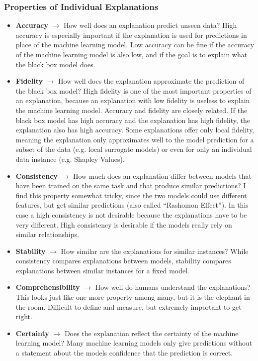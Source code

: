 \subsubsection{Properties of Individual Explanations}
\begin{itemize}
    \item \textbf{Accuracy} $\rightarrow$ How well does an explanation predict unseen data? High accuracy is especially important if the explanation is used for predictions in place of the machine learning model. 
    Low accuracy can be fine if the accuracy of the machine learning model is also low, and if the goal is to explain what the black box model does.
    \item \textbf{Fidelity} $\rightarrow$ How well does the explanation approximate the prediction of the black box model?  High fidelity is one of the most important properties of an explanation, because an explanation 
    with low fidelity is useless to explain the machine learning model. Accuracy and fidelity are closely related. If the black box model has high accuracy and the explanation has high fidelity, the explanation also has 
    high accuracy. Some explanations offer only local fidelity, meaning the explanation only approximates well to the model prediction for a subset of the data (e.g. local surrogate models) or even for only an individual 
    data instance (e.g. Shapley Values).
    \item \textbf{Consistency} $\rightarrow$ How much does an explanation differ between models that have been trained on the same task and that produce similar predictions? I find this property somewhat tricky, since the 
    two models could use different features, but get similar predictions (also called “Rashomon Effect”). In this case a high consistency is not desirable because the explanations have to be very different. High consistency 
    is desirable if the models really rely on similar relationships.
    \item \textbf{Stability} $\rightarrow$ How similar are the explanations for similar instances? While consistency compares explanations between models, stability compares explanations between similar instances for a fixed model.
    \item \textbf{Comprehensibility} $\rightarrow$ How well do humans understand the explanations? This looks just like one more property among many, but it is the elephant in the room. Difficult to define and measure, but extremely important to get right.
    \item \textbf{Certainty} $\rightarrow$ Does the explanation reflect the certainty of the machine learning model? Many machine learning models only give predictions without a statement about the models confidence that the prediction is correct.

\end{itemize}
